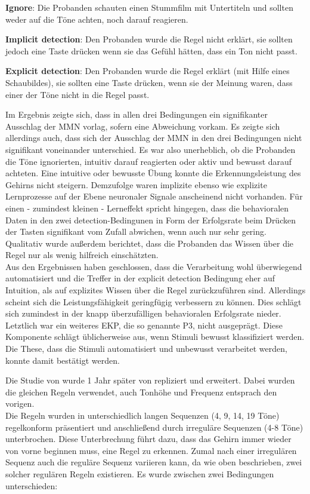 \documentclass[doc,a4paper,12pt]{apa6}
\begin{document}
\begin{compactitem}
  \item \textbf{Ignore}: Die Probanden schauten einen Stummfilm mit Untertiteln und sollten weder auf die Töne achten, noch darauf reagieren.
  \item \textbf{Implicit detection}: Den Probanden wurde die Regel nicht erklärt, sie sollten jedoch eine Taste drücken wenn sie das Gefühl hätten, dass ein Ton nicht passt.
  \item \textbf{Explicit detection}: Den Probanden wurde die Regel erklärt (mit Hilfe eines Schaubildes), sie sollten eine Taste drücken, wenn sie der Meinung waren, dass einer der Töne nicht in die Regel passt.
\end{compactitem}

Im Ergebnis zeigte sich, dass in allen drei Bedingungen ein signifikanter Ausschlag der MMN vorlag, sofern eine Abweichung vorkam. Es zeigte sich allerdings auch, dass sich der Ausschlag der MMN in den drei Bedingungen nicht signifikant voneinander unterschied. Es war also unerheblich, ob die Probanden die Töne ignorierten, intuitiv darauf reagierten oder aktiv und bewusst darauf achteten. Eine intuitive oder bewusste Übung konnte die Erkennungsleistung des Gehirns nicht steigern. Demzufolge waren implizite ebenso wie explizite Lernprozesse auf der Ebene neuronaler Signale anscheinend nicht vorhanden. Für einen - zumindest kleinen - Lerneffekt spricht hingegen, dass die behavioralen Daten in den zwei detection-Bedingunen in Form der Erfolgsrate beim Drücken der Tasten signifikant vom Zufall abwichen, wenn auch nur sehr gering. Qualitativ wurde außerdem berichtet, dass die Probanden das Wissen über die Regel nur als wenig hilfreich einschätzten.\\
Aus den Ergebnissen haben \textcite{paavilainen2007preattentive} geschlossen, dass die Verarbeitung wohl überwiegend automatisiert und die Treffer in der explicit detection Bedingung eher auf Intuition, als auf explizites Wissen über die Regel zurückzuführen sind. Allerdings scheint sich die  Leistungsfähigkeit geringfügig verbessern zu können. Dies schlägt sich zumindest in der knapp überzufälligen behavioralen Erfolgsrate nieder. Letztlich war ein weiteres EKP, die so genannte P3, nicht ausgeprägt. Diese Komponente schlägt üblicherweise aus, wenn Stimuli bewusst klassifiziert werden. Die These, dass die Stimuli automatisiert und unbewusst verarbeitet werden, konnte damit bestätigt werden.

Die Studie von \textcite{paavilainen2007preattentive} wurde 1 Jahr später von \textcite{bendixen2008rapid} repliziert und erweitert. Dabei wurden die gleichen Regeln verwendet, auch Tonhöhe und Frequenz entsprach den vorigen.\\
Die Regeln wurden in unterschiedlich langen Sequenzen (4, 9, 14, 19 Töne) regelkonform präsentiert und anschließend durch irreguläre Sequenzen (4-8 Töne) unterbrochen. Diese Unterbrechung führt dazu, dass das Gehirn immer wieder von vorne beginnen muss, eine Regel zu erkennen. Zumal nach einer irregulären Sequenz auch die reguläre Sequenz variieren kann, da wie oben beschrieben, zwei solcher regulären Regeln existieren. Es wurde zwischen zwei Bedingungen unterschieden:
\end{document}
